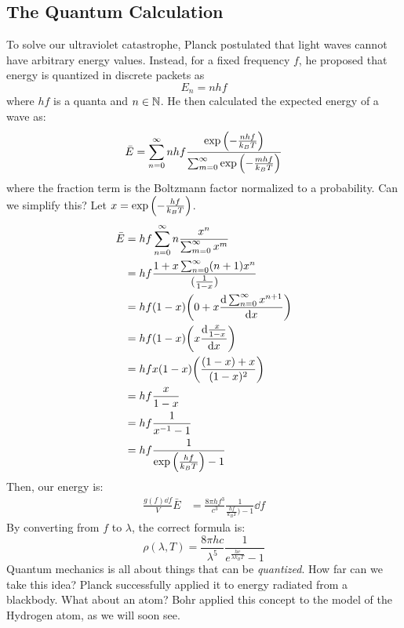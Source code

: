 \subsection{The Quantum Calculation}
To solve our ultraviolet catastrophe, Planck postulated that light waves cannot have arbitrary energy values. Instead, for a fixed frequency $f$, he proposed that energy
is quantized in discrete packets as
\[ E_n = nhf \]
where $hf$ is a quanta and $n \in \operatorname{\mathbb{N}}$. He then calculated the expected energy of a wave as:
\begin{align*}
    \bar{E} = \sum_{n = 0}^{\infty} nhf \frac{\exp\qty(- \frac{nhf}{k_B T})}{\sum_{m = 0}^{\infty} \exp\qty(- \frac{mhf}{k_B T})}
\end{align*}
where the fraction term is the Boltzmann factor normalized to a probability. Can we simplify this? Let $x = \exp\qty(- \frac{hf}{k_B T})$.
\begin{align*}
    \bar{E} &= hf \sum_{n = 0}^{\infty} n \frac{x^n}{\sum_{m = 0}^{\infty} x^m} \\
    &= hf \frac{1 + x \sum_{n = 0}^{\infty} (n + 1) x^n}{(\frac{1}{1 - x})} \\
    &= hf (1 - x) \qty(0 + x \derivative{\sum_{n = 0}^{\infty} x^{n + 1}}{x}) \\
    &= hf (1 - x) \qty(x \derivative{\frac{x}{1 - x}}{x}) \\
    &= hf x(1 - x) \qty(\frac{(1 - x) + x}{(1 - x)^2}) \\
    &= hf \frac{x}{1 - x} \\
    &= hf \frac{1}{x^{-1} - 1} \\
    &= hf \frac{1}{\exp\qty(\frac{hf}{k_B T}) - 1}
\end{align*}
Then, our energy is:
\begin{align*}
    \frac{g(f) \dd{f}}{V} \bar{E} &= \frac{8 \pi h f^3}{c^3} \frac{1}{\frac{hf}{k_B T}) - 1} \dd{f}
\end{align*}
By converting from $f$ to $\lambda$, the correct formula is:
\[ \rho(\lambda, T) = \frac{8 \pi hc}{\lambda^5} \frac{1}{e^{\frac{hc}{\lambda k_B T}} - 1} \]
Quantum mechanics is all about things that can be \textit{quantized}. How far can we take this idea? Planck successfully
applied it to energy radiated from a blackbody. What about an atom? Bohr applied this concept to the model of the Hydrogen atom,
as we will soon see.